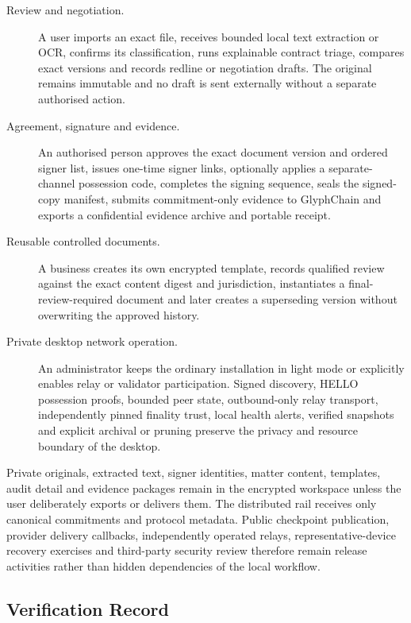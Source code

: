 \begin{description}
  \item[Review and negotiation.] A user imports an exact file, receives bounded
        local text extraction or OCR, confirms its classification, runs
        explainable contract triage, compares exact versions and records redline
        or negotiation drafts.  The original remains immutable and no draft is
        sent externally without a separate authorised action.
  \item[Agreement, signature and evidence.] An authorised person approves the
        exact document version and ordered signer list, issues one-time signer
        links, optionally applies a separate-channel possession code, completes
        the signing sequence, seals the signed-copy manifest, submits
        commitment-only evidence to GlyphChain and exports a confidential
        evidence archive and portable receipt.
  \item[Reusable controlled documents.] A business creates its own encrypted
        template, records qualified review against the exact content digest and
        jurisdiction, instantiates a final-review-required document and later
        creates a superseding version without overwriting the approved history.
  \item[Private desktop network operation.] An administrator keeps the ordinary
        installation in light mode or explicitly enables relay or validator
        participation.  Signed discovery, HELLO possession proofs, bounded peer
        state, outbound-only relay transport, independently pinned finality
        trust, local health alerts, verified snapshots and explicit archival or
        pruning preserve the privacy and resource boundary of the desktop.
\end{description}

Private originals, extracted text, signer identities, matter content, templates,
audit detail and evidence packages remain in the encrypted workspace unless the
user deliberately exports or delivers them.  The distributed rail receives
only canonical commitments and protocol metadata.  Public checkpoint
publication, provider delivery callbacks, independently operated relays,
representative-device recovery exercises and third-party security review
therefore remain release activities rather than hidden dependencies of the
local workflow.

\subsection{Verification Record}

